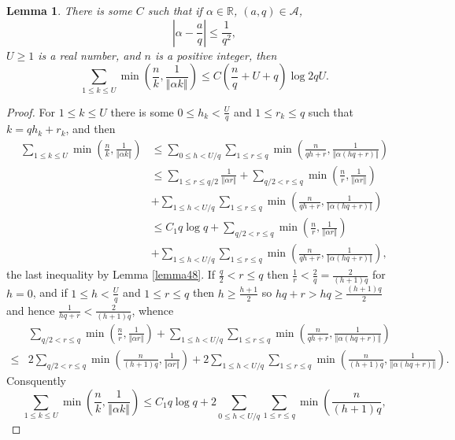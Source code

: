 \documentclass{article}
\newcommand{\norm}[1]{\left\Vert #1 \right\Vert}
\newtheorem{lemma}[theorem]{Lemma}
\begin{document}
\begin{lemma}
There is some $C$ such that if $\alpha \in \mathbb{R}$, $(a,q) \in \mathscr{A}$, 
\[
\left|\alpha - \frac{a}{q} \right| \leq \frac{1}{q^2},
\]
 $U \geq 1$ is a real number, and $n$ is a positive integer, then
\[
\sum_{1 \leq k \leq U} \min\left( \frac{n}{k}, \frac{1}{\norm{\alpha k}} \right) \leq C
\left(\frac{n}{q}+U+q\right) \log 2qU.
\]
\label{lemma410}
\end{lemma}
\begin{proof}
For $1 \leq k \leq U$ there is some $0 \leq h_k < \frac{U}{q}$ and
$1 \leq r_k \leq q$ such that $k=q h_k  + r_k$, and then
\begin{align*}
\sum_{1 \leq k \leq U} \min\left( \frac{n}{k}, \frac{1}{\norm{\alpha k}} \right)
&\leq \sum_{0 \leq h < U/q} \sum_{1 \leq r \leq q} \min\left(\frac{n}{qh+r},\frac{1}{\norm{\alpha(hq+r)}}\right)\\
&\leq \sum_{1 \leq r \leq q/2} \frac{1}{\norm{\alpha r}}+\sum_{q/2<r \leq q}  \min\left(\frac{n}{r},\frac{1}{\norm{\alpha r}}\right)\\
&+\sum_{1 \leq h < U/q} \sum_{1 \leq r \leq q}\min\left(\frac{n}{qh+r},\frac{1}{\norm{\alpha(hq+r)}}\right)\\
&\leq C_1  q \log q 
+\sum_{q/2<r \leq q}  \min\left(\frac{n}{r},\frac{1}{\norm{\alpha r}}\right)\\
&+\sum_{1 \leq h < U/q} \sum_{1 \leq r \leq q}\min\left(\frac{n}{qh+r},\frac{1}{\norm{\alpha(hq+r)}}\right),
\end{align*}
the last inequality by Lemma \ref{lemma48}.
If $\frac{q}{2} < r \leq q$ then 
$\frac{1}{r} < \frac{2}{q} = \frac{2}{(h+1)q}$ for $h=0$, and if
$1 \leq h < \frac{U}{q}$ and $1 \leq r \leq q$ then $h \geq \frac{h+1}{2}$ so
$hq+r > hq \geq \frac{(h+1)q}{2}$ and hence
$\frac{1}{hq+r} < \frac{2}{(h+1)q}$, whence
\[
\begin{split}
&\sum_{q/2<r \leq q}  \min\left(\frac{n}{r},\frac{1}{\norm{\alpha r}}\right)+
\sum_{1 \leq h < U/q} \sum_{1 \leq r \leq q}\min\left(\frac{n}{qh+r},\frac{1}{\norm{\alpha(hq+r)}}\right)\\
\leq&2\sum_{q/2<r \leq q}  \min\left( \frac{n}{(h+1)q},\frac{1}{\norm{\alpha r}}\right)+
2\sum_{1 \leq h < U/q}  \sum_{1 \leq r \leq q} \min\left( \frac{n}{(h+1)q},\frac{1}{\norm{\alpha(hq+r)}}\right).
\end{split}
\]
Consquently 
\[
\sum_{1 \leq k \leq U} \min\left( \frac{n}{k}, \frac{1}{\norm{\alpha k}} \right)
\leq C_1 q \log q + 2 \sum_{0 \leq h < U/q} \sum_{1 \leq r \leq q} \min\left( \frac{n}{(h+1)q},
\]
\end{proof}
\end{document}
